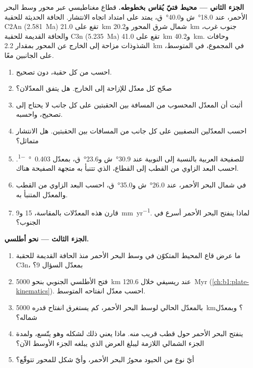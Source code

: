 \begin{problem}
\medskip
\noindent\textbf{الجزء الثاني --- محيط فتيّ يُقاس بخطوطه.} قطاع مغناطيسي عبر محور وسط البحر الأحمر، عند \ang{18.0}~ش و\ang{40.0}~ق، يمتد على امتداد اتجاه الانتشار. الحافة الحديثة للحقبة C2An (\qty{2.581}{Ma}) تقع على \qty{21.0}{km} شمال شرق المحور و\qty{20.2}{km} جنوب غرب، والحافة القديمة للحقبة C3n (\qty{5.235}{Ma}) تقع على \qty{41.0}{km} و\qty{40.2}{km}. وحافات الشذوذات مزاحة إلى الخارج عن المحور بمقدار \qty{2.2}{km} في المجموع، في المتوسط، على الجانبين معًا.
\begin{enumerate}[resume]
  \item احسب  من كل حقبة، دون تصحيح.
  \item صحّح كل معدّل للإزاحة إلى الخارج. هل يتفق المعدّلان؟
  \item أثبت أن المعدّل المحسوب من المسافة بين الحقبتين على كل جانب لا يحتاج إلى تصحيح، واحسبه.
  \item احسب المعدّلين النصفيين على كل جانب من المسافات بين الحقبتين. هل الانتشار متماثل؟
  \item {} للصفيحة العربية بالنسبة إلى النوبية عند \ang{30.9}~ش و\ang{23.6}~ق، بمعدّل \qty{0.403}{\degree\per\Myr}. احسب البعد الزاوي من القطب إلى القطاع،  الذي تتنبأ به متجهة الصفيحة هناك.
  \item في شمال البحر الأحمر، عند \ang{26.0}~ش و\ang{35.0}~ق، احسب البعد الزاوي من القطب والمعدّل المتنبأ به.
  \item قارن هذه المعدّلات بالمقاسة، 15 و\qty{9}{mm.yr^{-1}}. لماذا ينفتح البحر الأحمر أسرع في الجنوب؟
\end{enumerate}

\medskip
\noindent\textbf{الجزء الثالث --- نحو أطلسي.}
\begin{enumerate}[resume]
  \item ما عرض قاع المحيط المتكوّن في وسط البحر الأحمر منذ الحافة القديمة للحقبة C3n، بمعدّل السؤال 9؟
  \item فتح الأطلسي الجنوبي بنحو \qty{5000}{km} عند ريسيفي خلال \qty{120.6}{Myr} (\cref{ch:b1:plate-kinematics}). احسب معدّل انفتاحه المتوسط.
  \item بالمعدّل الحالي لوسط البحر الأحمر، كم يستغرق انفتاح قدره \qty{5000}{km}؟ وبمعدّل شماله؟
  \item ينفتح البحر الأحمر حول قطب قريب منه. ماذا يعني ذلك لشكله وهو يتّسع، ولمدة الجزء الشمالي اللازمة ليبلغ العرض الذي يبلغه الجزء الأوسط الآن؟
  \item أيّ نوع من الحيود محورُ البحر الأحمر، وأيّ شكل للمحور تتوقّع؟
\end{enumerate}


\end{problem}
